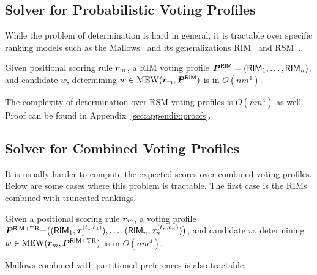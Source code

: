 \subsection{Solver for Probabilistic Voting Profiles}

While the problem of \mew determination is hard in general, it is tractable over specific ranking models such as the Mallows~\cite{Mallows1957} and its generalizations RIM~\cite{Doignon2004} and RSM~\cite{DBLP:journals/tdasci/ChakrabortyDKKR21}.

\def\theoremTractabilityOfRIM{
  Given positional scoring rule $\vr_m$, a RIM voting profile $\rimVP = (\enum[n]{\RIM})$, and candidate $w$, determining $w \in \mew(\vr_m, \rimVP)$ is in $O(nm^4)$.
}

\begin{theorem} \label{theorem:tractability_of_rimVP}
    \theoremTractabilityOfRIM
\end{theorem}

The complexity of \mew determination over RSM voting profiles is $O(nm^4)$ as well.
Proof can be found in Appendix~\ref{sec:appendix:proofs}.

\subsection{Solver for Combined Voting Profiles}

It is usually harder to compute the expected scores over combined voting profiles.
Below are some cases where this problem is tractable.
The first case is the RIMs combined with truncated rankings.

\def\theoremTractabilityOfRimTrun{
  Given a positional scoring rule $\vr_m$, a voting profile $\rimTrunVP {=} \big( (\RIM_1, \ranking_1^{(t_1, b_1)}), \ldots, \\(\RIM_n, \ranking_n^{(t_n, b_n)}) \big)$, and candidate $w$, determining $w \in \mew(\vr_m, \rimTrunVP)$ is in $O(nm^4)$.
}

\begin{theorem} \label{theorem:tractability_of_rimTrunVP}
    \theoremTractabilityOfRimTrun
\end{theorem}

Mallows combined with partitioned preferences is also tractable.

\def\theoremTractabilityOfMallowsFP{
  Given a positional scoring rule $\vr_m$, a voting profile $\mallowsPartitionVP=\big( (\mallows_1, \fullpar_1), \ldots, \\(\mallows_n, \fullpar_n) \big)$, and candidate $w$, determining $w \in \mew(\vr_m, \mallowsPartitionVP)$ is in $O(nm^4)$.
}

